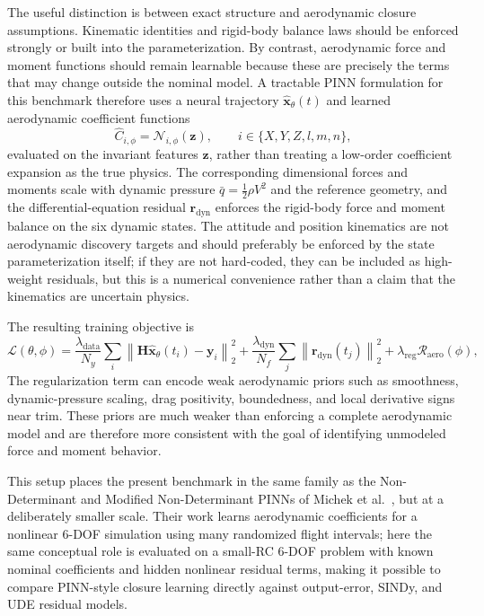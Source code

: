 \documentclass[11pt]{article}
\begin{document}
The useful distinction is between exact structure and aerodynamic closure assumptions. Kinematic identities and rigid-body balance laws should be enforced strongly or built into the parameterization. By contrast, aerodynamic force and moment functions should remain learnable because these are precisely the terms that may change outside the nominal model. A tractable PINN formulation for this benchmark therefore uses a neural trajectory $\widehat{\mathbf{x}}_\theta(t)$ and learned aerodynamic coefficient functions
\[
\widehat{C}_{i,\phi}=\mathcal{N}_{i,\phi}(\mathbf{z}),\qquad
i\in\{X,Y,Z,l,m,n\},
\]
evaluated on the invariant features $\mathbf{z}$, rather than treating a low-order coefficient expansion as the true physics. The corresponding dimensional forces and moments scale with dynamic pressure $\bar{q}=\frac{1}{2}\rho V^2$ and the reference geometry, and the differential-equation residual $\mathbf{r}_{\mathrm{dyn}}$ enforces the rigid-body force and moment balance on the six dynamic states. The attitude and position kinematics are not aerodynamic discovery targets and should preferably be enforced by the state parameterization itself; if they are not hard-coded, they can be included as high-weight residuals, but this is a numerical convenience rather than a claim that the kinematics are uncertain physics.

The resulting training objective is
\[
\mathcal{L}(\theta,\phi)=
\frac{\lambda_{\mathrm{data}}}{N_y}\sum_i
\left\|\mathbf{H}\widehat{\mathbf{x}}_\theta(t_i)-\mathbf{y}_i\right\|_2^2
+\frac{\lambda_{\mathrm{dyn}}}{N_f}\sum_j
\left\|\mathbf{r}_{\mathrm{dyn}}(t_j)\right\|_2^2
+\lambda_{\mathrm{reg}}\mathcal{R}_{\mathrm{aero}}(\phi),
\]
The regularization term can encode weak aerodynamic priors such as smoothness, dynamic-pressure scaling, drag positivity, boundedness, and local derivative signs near trim. These priors are much weaker than enforcing a complete aerodynamic model and are therefore more consistent with the goal of identifying unmodeled force and moment behavior.

This setup places the present benchmark in the same family as the Non-Determinant and Modified Non-Determinant PINNs of Michek et al.~\citep{michek2026flight}, but at a deliberately smaller scale. Their work learns aerodynamic coefficients for a nonlinear 6-DOF simulation using many randomized flight intervals; here the same conceptual role is evaluated on a small-RC 6-DOF problem with known nominal coefficients and hidden nonlinear residual terms, making it possible to compare PINN-style closure learning directly against output-error, SINDy, and UDE residual models.
\end{document}
